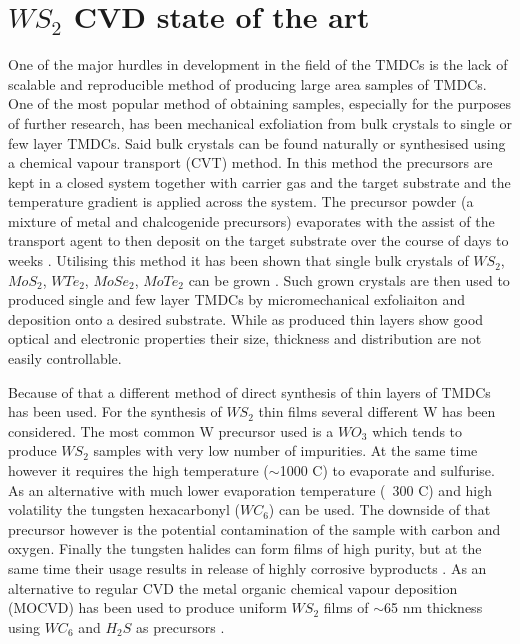 \section{$WS_2$ CVD state of the art}

One of the major hurdles in development in the field of the TMDCs is the lack of scalable and reproducible method of producing large area samples of TMDCs. One of the most popular method of obtaining samples, especially for the purposes of further research, has been mechanical exfoliation from bulk crystals to single or few layer TMDCs. Said bulk crystals can be found naturally or synthesised using a chemical vapour transport (CVT) method. In this method the precursors are kept in a closed system together with carrier gas and the target substrate and the temperature gradient is applied across the system. The precursor powder (a mixture of metal and chalcogenide precursors) evaporates with the assist of the transport agent to then deposit on the target substrate over the course of days to weeks \cite{Reale2016}\cite{Schmidt2013}. Utilising this method it has been shown that single bulk crystals of $WS_2$, $MoS_2$, $WTe_2$, $MoSe_2$, $MoTe_2$ can be grown \cite{Reale2016}\cite{Schmidt2013}\cite{Al-Hilli1972}\cite{Brixner1962}\cite{Lenz1997}\cite{Brown1966}\cite{Sunil1997}\cite{Lenz1997}. Such grown crystals are then used to produced single and few layer TMDCs by micromechanical exfoliaiton and deposition onto a desired substrate. While as produced thin layers show good optical and electronic properties their size, thickness and distribution are not easily controllable.

Because of that a different method of direct synthesis of thin layers of TMDCs has been used. For the synthesis of $WS_2$ thin films several different W has been considered. The most common W precursor used is a $WO_3$ which tends to produce $WS_2$ samples with very low number of impurities. At the same time however it requires the high temperature ($\sim$1000 {\degree}C) to evaporate and sulfurise. As an alternative with much lower evaporation temperature (~300 {\degree}C) and high volatility the tungsten hexacarbonyl ($WC_6$) can be used. The downside of that precursor however is the potential contamination of the sample with carbon and oxygen. Finally the tungsten halides can form films of high purity, but at the same time their usage results in release of highly corrosive byproducts \cite{Reale2016}. As an alternative to regular CVD the metal organic chemical vapour deposition (MOCVD) has been used to produce uniform $WS_2$ films of $\sim$65 nm thickness using $WC_6$ and $H_2S$ as precursors \cite{Chung1998}.


